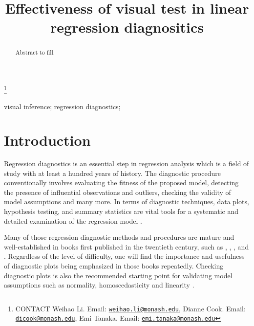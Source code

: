 \documentclass[]{interact}
\theoremstyle{plain}%
\theoremstyle{definition}
\theoremstyle{remark}
\begin{document}

\title{Effectiveness of visual test in linear regression diagnositics}


\author{
}

\thanks{CONTACT Weihao
Li. Email: \href{mailto:weihao.li@monash.edu}{\nolinkurl{weihao.li@monash.edu}}, Dianne
Cook. Email: \href{mailto:dicook@monash.edu}{\nolinkurl{dicook@monash.edu}}, Emi
Tanaka. Email: \href{mailto:emi.tanaka@monash.edu}{\nolinkurl{emi.tanaka@monash.edu}}}

\maketitle

\begin{abstract}
Abstract to fill.
\end{abstract}

\begin{keywords}
visual inference; regression diagnostics;
\end{keywords}

\hypertarget{introduction}{%
\section{Introduction}\label{introduction}}

Regression diagnostics is an essential step in regression analysis which
is a field of study with at least a hundred years of history. The
diagnostic procedure conventionally involves evaluating the fitness of
the proposed model, detecting the presence of influential observations
and outliers, checking the validity of model assumptions and many more.
In terms of diagnostic techniques, data plots, hypothesis testing, and
summary statistics are vital tools for a systematic and detailed
examination of the regression model \citep{mansfield1987diagnostic}.

Many of those regression diagnostic methods and procedures are mature
and well-established in books first published in the twentieth century,
such as \citet{draper1998applied}, \citet{montgomery1982introduction},
\citet{belsley_regression_1980}, \citet{cook_applied_1999} and
\citet{cook1982residuals}. Regardless of the level of difficulty, one
will find the importance and usefulness of diagnostic plots being
emphasized in those books repeatedly. Checking diagnostic plots is also
the recommended starting point for validating model assumptions such as
normality, homoscedasticity and linearity
\citep{anscombe_examination_1963}.
\end{document}
